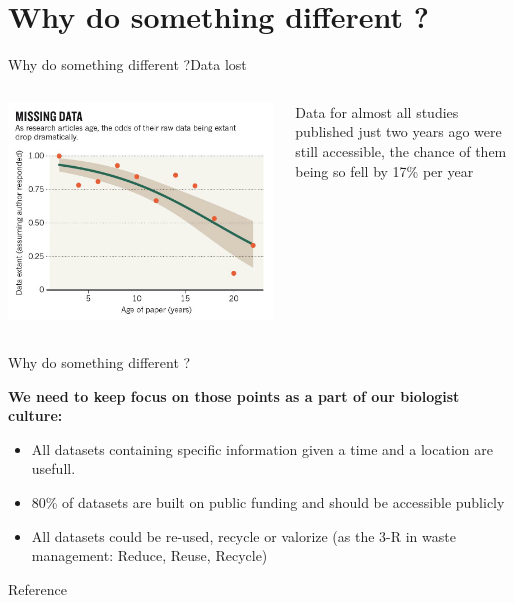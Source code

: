 \documentclass{eecslides}
\begin{document}
\section{Why do something different ?}


\begin{frame}{Why do something different ?}{Data lost}


\begin{columns}[c]
	\begin{column}{.50\paperwidth}
		\includegraphics[width=.50\paperwidth]{Nature_fig.jpg}
	\end{column}
	\begin{column}{.4\paperwidth}
		 Data for almost all studies published just two years ago were still accessible, the chance of them being so \alert{fell by 17\% per year} \citep{Vines2013}
	\end{column}
\end{columns}


\end{frame}


\begin{frame}{Why do something different ?}

\textbf{We need to keep focus on those points as a part of our biologist culture:}
	
	\begin{itemize}
		\item \alert{All datasets} containing specific information given a time and a location \alert{are usefull}.
		\item 80\% of datasets are built on \alert{public funding} \citep{Graham2013} and should be accessible publicly
		\item All datasets could be re-used, recycle or valorize (as the 3-R in waste management: Reduce, Reuse, Recycle) 
	\end{itemize}


\end{frame}


\nocite{Poisot2013a}

\begin{frame}[allowsframebreaks]{Reference}
	
		
\end{frame}
\end{document}
